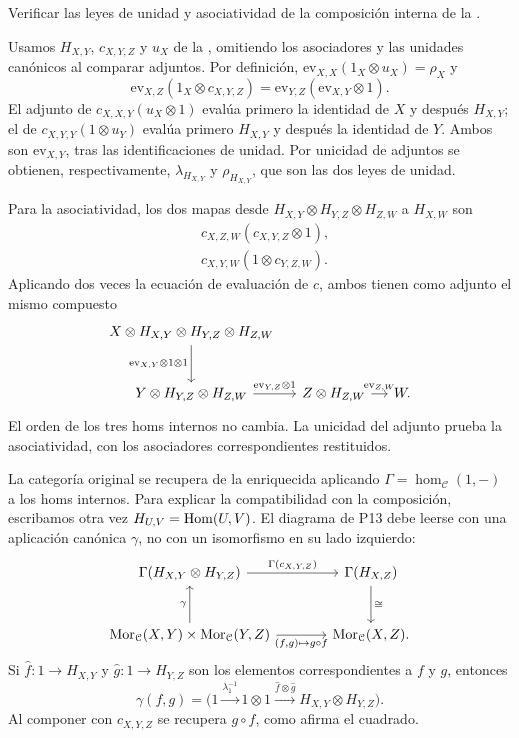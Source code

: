 \begin{ejer}
Verificar las leyes de unidad y asociatividad de la composición interna de la .
\end{ejer}
\begin{sol}
Usamos $H_{X,Y}$, $c_{X,Y,Z}$ y $u_X$ de la , omitiendo los asociadores y las unidades canónicos al comparar adjuntos. Por definición, $\mathrm{ev}_{X,X}(1_X\otimes u_X)=\rho_X$ y
\[
\mathrm{ev}_{X,Z}(1_X\otimes c_{X,Y,Z})
=\mathrm{ev}_{Y,Z}(\mathrm{ev}_{X,Y}\otimes1).
\]
El adjunto de $c_{X,X,Y}(u_X\otimes1)$ evalúa primero la identidad de $X$ y después $H_{X,Y}$; el de $c_{X,Y,Y}(1\otimes u_Y)$ evalúa primero $H_{X,Y}$ y después la identidad de $Y$. Ambos son $\mathrm{ev}_{X,Y}$, tras las identificaciones de unidad. Por unicidad de adjuntos se obtienen, respectivamente, $\lambda_{H_{X,Y}}$ y $\rho_{H_{X,Y}}$, que son las dos leyes de unidad.

Para la asociatividad, los dos mapas desde $H_{X,Y}\otimes H_{Y,Z}\otimes H_{Z,W}$ a $H_{X,W}$ son
\[
\begin{aligned}
&c_{X,Z,W}(c_{X,Y,Z}\otimes1),\\
&c_{X,Y,W}(1\otimes c_{Y,Z,W}).
\end{aligned}
\]
Aplicando dos veces la ecuación de evaluación de $c$, ambos tienen como adjunto el mismo compuesto
\[
\begin{tikzcd}[column sep=small,row sep=large]
X\otimes H_{X,Y}\otimes H_{Y,Z}\otimes H_{Z,W}
\arrow[d,"{\mathrm{ev}_{X,Y}\otimes1\otimes1}"']\\
Y\otimes H_{Y,Z}\otimes H_{Z,W}
\arrow[r,"{\mathrm{ev}_{Y,Z}\otimes1}"]
& Z\otimes H_{Z,W}\arrow[r,"{\mathrm{ev}_{Z,W}}"] & W.
\end{tikzcd}
\]
El orden de los tres homs internos no cambia. La unicidad del adjunto prueba la asociatividad, con los asociadores correspondientes restituidos.
\end{sol}

La categoría original se recupera de la enriquecida aplicando
$\Gamma=\hom_{\mathcal C}(1,-)$ a los homs internos. Para explicar la compatibilidad con la composición, escribamos otra vez $H_{U,V}=\operatorname{Hom}(U,V)$. El diagrama de P13 debe leerse con una aplicación canónica $\gamma$, no con un isomorfismo en su lado izquierdo:
\[
\begin{tikzcd}[column sep=large,row sep=large]
\Gamma(H_{X,Y}\otimes H_{Y,Z})
 \arrow[r,"{\Gamma(c_{X,Y,Z})}"]
 &\Gamma(H_{X,Z}) \arrow[d,"{\cong}"]\\
\hom_{\mathcal C}(X,Y)\times\hom_{\mathcal C}(Y,Z)
 \arrow[u,"{\gamma}"]
 \arrow[r,"{(f,g)\mapsto g\circ f}"']
 &\hom_{\mathcal C}(X,Z).
\end{tikzcd}
\]
Si $\widehat f\colon1\to H_{X,Y}$ y $\widehat g\colon1\to H_{Y,Z}$ son los elementos correspondientes a $f$ y $g$, entonces
\[
\gamma(f,g)=
\bigl(1\xrightarrow{\lambda_1^{-1}}1\otimes1
\xrightarrow{\widehat f\otimes\widehat g}H_{X,Y}\otimes H_{Y,Z}\bigr).
\]
Al componer con $c_{X,Y,Z}$ se recupera $g\circ f$, como afirma el cuadrado.

